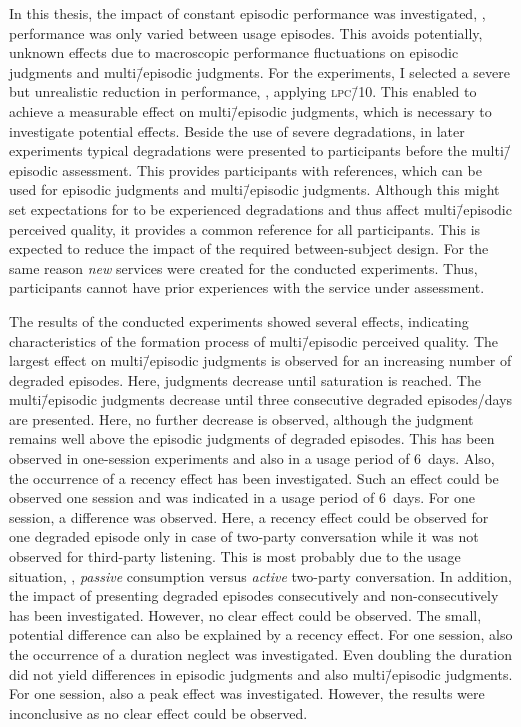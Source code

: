 In this thesis, the impact of constant episodic performance was investigated, \ie, performance was only varied between usage episodes.
This avoids potentially, unknown effects due to macroscopic performance fluctuations on episodic judgments and multi\=/episodic judgments.
For the experiments, I selected a severe but unrealistic reduction in performance, \ie, applying \textsc{\lowercase{LPC\=/10}}.
This enabled to achieve a measurable effect on multi\=/episodic judgments, which is necessary to investigate potential effects.
Beside the use of severe degradations, in later experiments typical degradations were presented to participants before the multi\=/episodic assessment.
This provides participants with references, which can be used for episodic judgments and multi\=/episodic judgments.
Although this might set expectations for to be experienced degradations and thus affect multi\=/episodic perceived quality, it provides a common reference for all participants.
This is expected to reduce the impact of the required between-subject design.
For the same reason \emph{new} services were created for the conducted experiments.
Thus, participants cannot have prior experiences with the service under assessment.

The results of the conducted experiments showed several effects, indicating characteristics of the formation process of multi\=/episodic perceived quality.
The largest effect on multi\=/episodic judgments is observed for an increasing number of degraded episodes.
Here, judgments decrease until saturation is reached.
The multi\=/episodic judgments decrease until three consecutive degraded episodes/days are presented.
Here, no further decrease is observed, although the judgment remains well above the episodic judgments of degraded episodes.
This has been observed in one-session experiments and also in a usage period of 6~days.
Also, the occurrence of a recency effect has been investigated.
Such an effect could be observed one session and was indicated in a usage period of 6~days.
For one session, a difference was observed.
Here, a recency effect could be observed for one degraded episode only in case of two-party conversation while it was not observed for third-party listening.
This is most probably due to the usage situation, \ie, \emph{passive} consumption versus \emph{active} two-party conversation.
In addition, the impact of presenting degraded episodes consecutively and non-consecutively has been investigated.
However, no clear effect could be observed.
The small, potential difference can also be explained by a recency effect.
For one session, also the occurrence of a duration neglect was investigated.
Even doubling the duration did not yield differences in episodic judgments and also multi\=/episodic judgments.
For one session, also a peak effect was investigated.
However, the results were inconclusive as no clear effect could be observed.

